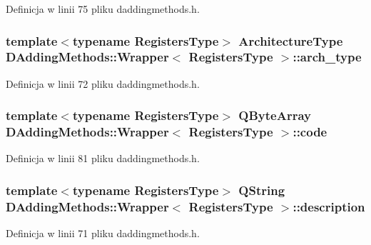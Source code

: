 Definicja w linii 75 pliku daddingmethods.\-h.

\hypertarget{class_d_adding_methods_1_1_wrapper_aa4f2505d3abca144ceaae01692ab2982}{
\subsubsection[{arch\-\_\-type}]{\setlength{\rightskip}{0pt plus 5cm}template$<$typename Registers\-Type$>$ {\bf Architecture\-Type} {\bf D\-Adding\-Methods\-::\-Wrapper}$<$ Registers\-Type $>$\-::arch\-\_\-type}}\label{class_d_adding_methods_1_1_wrapper_aa4f2505d3abca144ceaae01692ab2982}


Definicja w linii 72 pliku daddingmethods.\-h.

\hypertarget{class_d_adding_methods_1_1_wrapper_a1280984042d8167b8207d33488189415}{
\subsubsection[{code}]{\setlength{\rightskip}{0pt plus 5cm}template$<$typename Registers\-Type$>$ Q\-Byte\-Array {\bf D\-Adding\-Methods\-::\-Wrapper}$<$ Registers\-Type $>$\-::code}}\label{class_d_adding_methods_1_1_wrapper_a1280984042d8167b8207d33488189415}


Definicja w linii 81 pliku daddingmethods.\-h.

\hypertarget{class_d_adding_methods_1_1_wrapper_a1f27a97876d639a2e39482c4a3a6d274}{
\subsubsection[{description}]{\setlength{\rightskip}{0pt plus 5cm}template$<$typename Registers\-Type$>$ Q\-String {\bf D\-Adding\-Methods\-::\-Wrapper}$<$ Registers\-Type $>$\-::description}}\label{class_d_adding_methods_1_1_wrapper_a1f27a97876d639a2e39482c4a3a6d274}


Definicja w linii 71 pliku daddingmethods.\-h.

